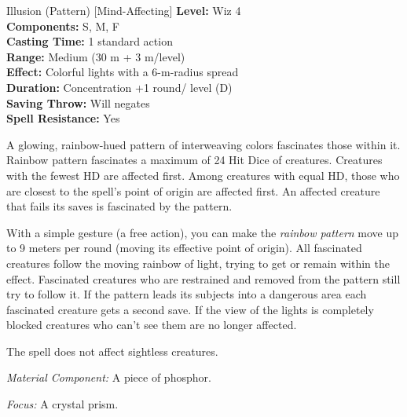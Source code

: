 {Illusion (Pattern) [Mind-Affecting]}
{
	\textbf{Level:}
	Wiz 4\\
	\textbf{Components:}
	S, M, F\\
	\textbf{Casting Time:}
	1 standard action\\
	\textbf{Range:}
	Medium (30 m + 3 m/level)\\
	\textbf{Effect:}
	Colorful lights with a 6-m-radius spread\\
	\textbf{Duration:}
	Concentration +1 round/ level (D)\\
	\textbf{Saving Throw:}
	Will negates\\
	\textbf{Spell Resistance:}
	Yes\\
}
{
	A glowing, rainbow-hued pattern of interweaving colors fascinates those within it. Rainbow pattern fascinates a maximum of 24 Hit Dice of creatures. Creatures with the fewest HD are affected first. Among creatures with equal HD, those who are closest to the spell's point of origin are affected first. An affected creature that fails its saves is fascinated by the pattern.

	With a simple gesture (a free action), you can make the \emph{rainbow pattern} move up to 9 meters per round (moving its effective point of origin). All fascinated creatures follow the moving rainbow of light, trying to get or remain within the effect. Fascinated creatures who are restrained and removed from the pattern still try to follow it. If the pattern leads its subjects into a dangerous area each fascinated creature gets a second save. If the view of the lights is completely blocked creatures who can't see them are no longer affected.

	The spell does not affect sightless creatures.

	\textit{Material Component:}
	A piece of phosphor.

	\textit{Focus:}
	A crystal prism.

}
